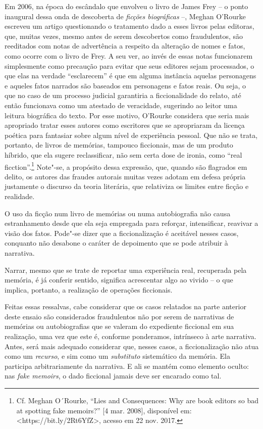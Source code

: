 Em 2006, na época do escândalo que envolveu o livro de James Frey -- o
ponto inaugural dessa onda de descoberta de \emph{ficções biográficas}
--, Meghan O'Rourke escreveu um artigo questionando o tratamento dado a
esses livros pelas editoras, que, muitas vezes, mesmo antes de serem
descobertos como fraudulentos, são reeditados com notas de advertência a
respeito da alteração de nomes e fatos, como ocorre com o livro de Frey.
A seu ver, ao invés de essas notas funcionarem simplesmente como
precaução para evitar que seus editores sejam processados, o que elas na
verdade ``esclarecem'' é que em alguma instância aquelas personagens e
aqueles fatos narrados são baseados em personagens e fatos reais. Ou
seja, o que no caso de um processo judicial garantiria a ficcionalidade
do relato, até então funcionava como um atestado de veracidade,
sugerindo ao leitor uma leitura biográfica do texto. Por esse motivo,
O'Rourke considera que seria mais apropriado tratar esses autores como
escritores que se apropriaram da licença poética para fantasiar sobre
algum nível de experiência pessoal. Que não se trata, portanto, de
livros de memórias, tampouco ficcionais, mas de um produto híbrido, que
ela sugere reclassificar, não sem certa dose de ironia, como ``real
ficction''.\footnote{Cf. Meghan O´Rourke, ``Lies and Consequences: Why
  are book editors so bad at spotting fake memoirs?'' {[}4 mar. 2008{]},
  disponível em:
  \textless{}https://bit.ly/2Rt6YfZ\textgreater{},
  acesso em 22 nov. 2017.} Note"-se, a propósito dessa expressão, que,
quando são flagrados em delito, os autores das fraudes autorais muitas
vezes adotam em defesa própria justamente o discurso da teoria
literária, que relativiza os limites entre ficção e realidade.

O uso da ficção num livro de memórias ou numa autobiografia não causa
estranhamento desde que ela seja empregada para reforçar, intensificar,
reavivar a visão dos fatos. Pode"-se dizer que a ficcionalização é
aceitável nesses casos, conquanto não desabone o caráter de depoimento
que se pode atribuir à narrativa.

Narrar, mesmo que se trate de reportar uma experiência real, recuperada
pela memória, é já conferir sentido, significa acrescentar algo ao
vivido -- o que implica, portanto, a realização de operações ficcionais.

Feitas essas ressalvas, cabe considerar que os casos relatados na parte
anterior deste ensaio são considerados fraudulentos não por serem de
narrativas de memórias ou autobiografias que se valeram do expediente
ficcional em sua realização, uma vez que este é, conforme ponderamos,
intrínseco à arte narrativa. Antes, será mais adequado considerar que,
nesses casos, a ficcionalização não atua como um \emph{recurso}, e sim
como um \emph{substituto} sistemático da memória. Ela participa
arbitrariamente da narrativa. E ali se mantém como elemento oculto: nas
\emph{fake memoirs}, o dado ficcional jamais deve ser encarado como tal.

